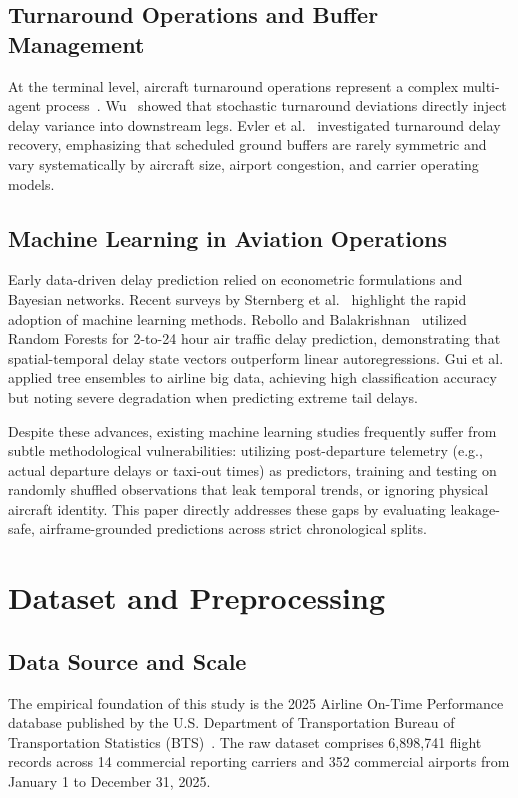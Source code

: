 \documentclass[conference]{IEEEtran}
\begin{document}
\subsection{Turnaround Operations and Buffer Management}
At the terminal level, aircraft turnaround operations represent a complex multi-agent process~\cite{fricke2009delay}. Wu~\cite{wu2005inherent} showed that stochastic turnaround deviations directly inject delay variance into downstream legs. Evler et al.~\cite{evler2021airline} investigated turnaround delay recovery, emphasizing that scheduled ground buffers are rarely symmetric and vary systematically by aircraft size, airport congestion, and carrier operating models.

\subsection{Machine Learning in Aviation Operations}
Early data-driven delay prediction relied on econometric formulations and Bayesian networks. Recent surveys by Sternberg et al.~\cite{sternberg2017review} highlight the rapid adoption of machine learning methods. Rebollo and Balakrishnan~\cite{rebollo2014characterization} utilized Random Forests for 2-to-24 hour air traffic delay prediction, demonstrating that spatial-temporal delay state vectors outperform linear autoregressions. Gui et al.~\cite{gui2020flight} applied tree ensembles to airline big data, achieving high classification accuracy but noting severe degradation when predicting extreme tail delays.

Despite these advances, existing machine learning studies frequently suffer from subtle methodological vulnerabilities: utilizing post-departure telemetry (e.g., actual departure delays or taxi-out times) as predictors, training and testing on randomly shuffled observations that leak temporal trends, or ignoring physical aircraft identity. This paper directly addresses these gaps by evaluating leakage-safe, airframe-grounded predictions across strict chronological splits.

\section{Dataset and Preprocessing}

\subsection{Data Source and Scale}
The empirical foundation of this study is the 2025 Airline On-Time Performance database published by the U.S. Department of Transportation Bureau of Transportation Statistics (BTS)~\cite{bts2025ontime}. The raw dataset comprises 6,898,741 flight records across 14 commercial reporting carriers and 352 commercial airports from January 1 to December 31, 2025.
\end{document}
